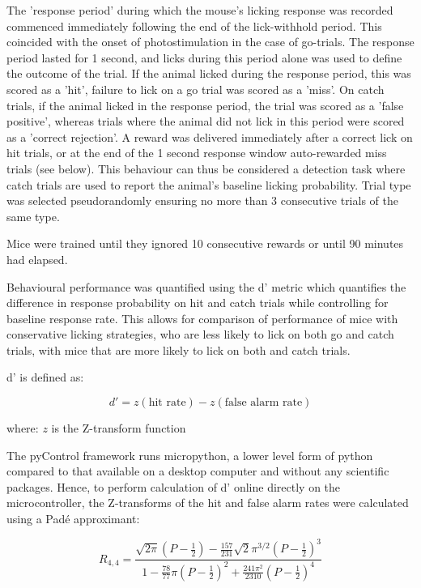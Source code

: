 The 'response period' during which the mouse's licking response was recorded commenced immediately following the end of the lick-withhold period. This coincided with the onset of photostimulation in the case of go-trials. The response period lasted for 1 second, and licks during this period alone was used to define the outcome of the trial. If the animal licked during the response period, this was scored as a 'hit', failure to lick on a go trial was scored as a 'miss'. On catch trials, if the animal licked in the response period, the trial was scored as a  'false positive', whereas trials where the animal did not lick in this period were scored as a 'correct rejection'. A reward was delivered immediately after a correct lick on hit trials, or at the end of the 1 second response window auto-rewarded miss trials (see below). This behaviour can thus be considered a detection task where catch trials are used to report the animal's baseline licking probability. Trial type was selected pseudorandomly ensuring no more than 3 consecutive trials of the same type.

Mice were trained until they ignored 10 consecutive rewards or until 90 minutes had elapsed.

Behavioural performance was quantified using the d' metric \citep{Brophy1986} which quantifies the difference in response probability on hit and catch trials while controlling for baseline response rate. This allows for comparison of performance of mice with conservative licking strategies, who are less likely to lick on both go and catch trials, with mice that are more likely to lick on both and catch trials.

d' is defined as:

\begin{equation}
d' = z(\text{hit rate}) - z(\text{false alarm rate})
\end{equation}

where: $z$ is the Z-transform function

The pyControl framework runs micropython, a lower level form of python compared to that available on a desktop computer and without any scientific packages. Hence, to perform calculation of d' online directly on the microcontroller, the Z-transforms of the hit and false alarm rates were calculated using a Pad\'e approximant:

\begin{equation} \label{eq:pade}
 R_{4,4} = \frac{\sqrt{2\pi}(P - \frac{1}{2}) - \frac{157}{231}\sqrt{2}\pi^{3/2}(P - \frac{1}{2})^{3}}{1-\frac{78}{77}\pi(P-\frac{1}{2})^{2} + \frac{241\pi^{2}}{2310}(P - \frac{1}{2})^{4}}
\end{equation}

